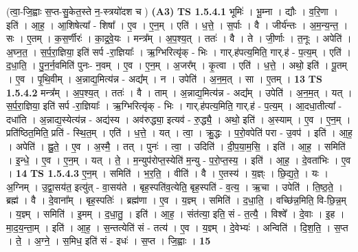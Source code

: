 \documentclass[17pt]{extarticle}
\begin{document}
                  \newline
                      (त्वा॒-जि॒ह्वाः स॒प्त-सु॒केत॒स्ते न॒-स्त्रयो॑दश च )  \textbf{(A3)} \newline \newline
                                \textbf{ TS 1.5.4.1} \newline
                  भूमिः॑ । भू॒म्ना । द्यौः । व॒रि॒णा । इति॑ । आ॒ह॒ । आ॒शिषेत्या᳚ - शिषा᳚ । ए॒व । ए॒न॒म् । एति॑ । ध॒त्ते॒ । स॒र्पाः । वै । जीर्य॑न्तः । अ॒म॒न्य॒न्त॒ । सः । ए॒तम् । क॒स॒र्णीरः॑ । का॒द्र॒वे॒यः । मन्त्र᳚म् । अ॒प॒श्य॒त् । ततः॑ । वै । ते । जी॒र्णाः । त॒नूः । अपेति॑ । अ॒घ्न॒त॒ । स॒र्प॒रा॒ज्ञिया॒ इति॑ सर्प -रा॒ज्ञियाः᳚ । ऋ॒ग्भिरित्यृ॑क् - भिः । गार्.ह॑पत्य॒मिति॒ गार्.ह॑ - प॒त्य॒म् । एति॑ । द॒धा॒ति॒ । पु॒न॒र्न॒वमिति॑ पुनः- न॒वम् । ए॒व । ए॒न॒म् । अ॒जर᳚म् । कृ॒त्वा । एति॑ । ध॒त्ते॒ । अथो॒ इति॑ । पू॒तम् । ए॒व । पृ॒थि॒वीम् । अ॒न्नाद्य॒मित्य॑न्न - अद्य᳚म् । न । उपेति॑ । अ॒न॒म॒त् । सा । ए॒तम् । \textbf{  13} \newline
                  \newline
                                \textbf{ TS 1.5.4.2} \newline
                  मन्त्र᳚म् । अ॒प॒श्य॒त् । ततः॑ । वै । ताम् । अ॒न्नाद्य॒मित्य॑न्न - अद्य᳚म् । उपेति॑ । अ॒न॒म॒त् । यत् । स॒र्प॒रा॒ज्ञिया॒ इति॑ सर्प -रा॒ज्ञियाः᳚ । ऋ॒ग्भिरित्यृ॑क् - भिः । गार्.ह॑पत्य॒मिति॒ गार्.ह॑ - प॒त्य॒म् । आ॒दधा॒तीत्या᳚ - दधा॑ति । अ॒न्नाद्य॒स्येत्य॑न्न - अद्य॑स्य । अव॑रुद्ध्या॒ इत्यव॑ - रु॒द्ध्यै॒ । अथो॒ इति॑ । अ॒स्याम् । ए॒व । ए॒न॒म् । प्रति॑ष्ठित॒मिति॒ प्रति॑ - स्थि॒त॒म् । एति॑ । ध॒त्ते॒ । यत् । त्वा॒ । क्रु॒द्धः । प॒रो॒वपेति॑ परा - उ॒वप॑ । इति॑ । आ॒ह॒ । अपेति॑ । ह्नु॒ते॒ । ए॒व । अ॒स्मै॒ । तत् । पुनः॑ । त्वा॒ । उदिति॑ । दी॒प॒या॒म॒सि॒ । इति॑ । आ॒ह॒ । समिति॑ । इ॒न्धे॒ । ए॒व । ए॒न॒म् । यत् । ते॒ । म॒न्युप॑रोप्त॒स्येति॑ म॒न्यु - प॒रो॒प्त॒स्य॒ । इति॑ । आ॒ह॒ । दे॒वता॑भिः । ए॒व । \textbf{  14} \newline
                  \newline
                                \textbf{ TS 1.5.4.3} \newline
                  ए॒न॒म् । समिति॑ । भ॒र॒ति॒ । वीति॑ । वै । ए॒तस्य॑ । य॒ज्ञ्ः । छि॒द्य॒ते॒ । यः । अ॒ग्निम् । उ॒द्वा॒सय॑त॒ इत्यु॑त् - वा॒सय॑ते । बृह॒स्पति॑व॒त्येति॒॒ बृह॒स्पति॑ - व॒त्य॒ । ऋ॒चा । उपेति॑ । ति॒ष्ठ॒ते॒ । ब्रह्म॑ । वै । दे॒वाना᳚म् । बृह॒स्पतिः॑ । ब्रह्म॑णा । ए॒व । य॒ज्ञ्म् । समिति॑ । द॒धा॒ति॒ । वच्छि॑न्न॒मिति॒ वि-छि॒न्न॒म् । य॒ज्ञ्म् । समिति॑ । इ॒मम् । द॒धा॒तु॒ । इति॑ । आ॒ह॒ । संत॑त्या॒ इति॒ सं - त॒त्यै॒ । विश्वे᳚ । दे॒वाः । इ॒ह । मा॒द॒य॒न्ता॒म् । इति॑ । आ॒ह॒ । स॒न्तत्येति॑ सं - तत्य॑ । ए॒व । य॒ज्ञ्म् । दे॒वेभ्यः॑ । अन्विति॑ । दि॒श॒ति॒ । स॒प्त । ते॒ । अ॒ग्ने॒ । स॒मिध॒ इति॑ सं - इधः॑ । स॒प्त । जि॒ह्वाः । \textbf{  15} \newline
\end{document}
